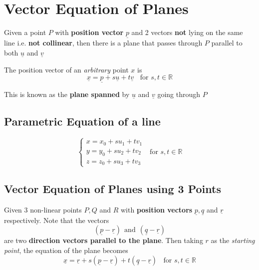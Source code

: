 \section{Vector Equation of Planes}
\begin{definition}
	Given a point $P$ with {\bf position vector} $\underline{p}$ and 2 vectors {\bf not} lying on the same line i.e. {\bf not collinear}, then there is a plane that passes
	through $P$ parallel to both $\underline{u}$ and $\underline{v}$

	The position vector of an {\em arbitrary} point $x$ is
	\begin{equation}
		\label{eq: vector-planes}
		\underline{x} = \underline{p} + s\underline{u} + t \underline{v} \ \ \ \ \text{for } s,t \in \mathbb{R}
	\end{equation}
\end{definition}
This is known as the {\bf plane spanned} by $\underline{u}$ and $\underline{v}$ going through $P$

\subsection{Parametric Equation of a line}
\begin{definition}
	\begin{equation}
		\label{eq: vector-planes-parametric}
		\begin{cases}
			x = x_0 + su_1 + tv_1 \\
			y = y_0 + su_2 + tv_2 \\
			z = z_0 + su_3 + tv_3
		\end{cases}
		\ \ \ \text{for } s,t \in \mathbb{R}
	\end{equation}
\end{definition}

\subsection{Vector Equation of Planes using 3 Points}
\begin{definition}
	Given 3 non-linear points $P, Q$ and $R$ with {\bf position vectors} $\underline{p}, \underline{q}$ and $\underline{r}$ respectively.
	Note that the vectors
	$$(\underline{p} - \underline{r}) \ \ \text{and} \ \  (\underline{q} - \underline{r})$$
	are two {\bf direction vectors parallel to the plane}. Then taking $r$ as the {\em starting point}, the equation of the plane becomes
	\begin{equation}
		\label{eq: vector-planes-3p}
		\underline{x} = \underline{r} + s(\underline{p} - \underline{r}) + t (\underline{q} - \underline{r}) \ \ \ \ \text{for } s,t \in \mathbb{R}
	\end{equation}
\end{definition}

